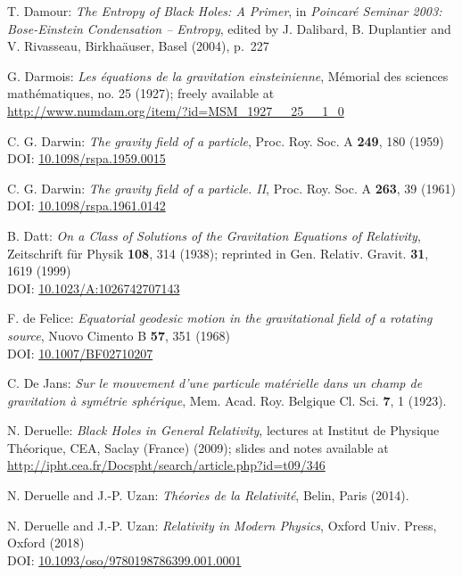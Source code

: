 \begin{thebibliography}{123}
T. Damour: {\em The Entropy of Black Holes: A Primer},
in {\em Poincaré Seminar 2003: Bose-Einstein Condensation -- Entropy},
edited by J. Dalibard, B. Duplantier and V. Rivasseau, Birkha\"auser, Basel (2004),
p.~227

G. Darmois:
{\em Les équations de la gravitation einsteinienne},
Mémorial des sciences mathématiques, no. 25 (1927); freely available at\\
\url{http://www.numdam.org/item/?id=MSM_1927__25__1_0}

C. G. Darwin: {\em The gravity field of a particle},
Proc. Roy. Soc. A {\bf 249}, 180 (1959)\\
DOI: \href{https://doi.org/10.1098/rspa.1959.0015}{10.1098/rspa.1959.0015}

C. G. Darwin: {\em The gravity field of a particle. II},
Proc. Roy. Soc. A {\bf 263}, 39 (1961)\\
DOI: \href{https://doi.org/10.1098/rspa.1961.0142}{10.1098/rspa.1961.0142}

B. Datt:
{\em On a Class of Solutions of the Gravitation Equations of Relativity},
Zeitschrift für Physik {\bf 108}, 314 (1938);
reprinted in Gen. Relativ. Gravit. {\bf 31}, 1619 (1999)\\
DOI: \href{https://doi.org/10.1023/A:1026742707143}{10.1023/A:1026742707143}

F. de Felice:
{\em Equatorial geodesic motion in the gravitational field of a rotating source},
Nuovo Cimento B {\bf 57}, 351 (1968)\\
DOI: \href{https://doi.org/10.1007/BF02710207}{10.1007/BF02710207}

C. De Jans:
\emph{Sur le mouvement d'une particule matérielle dans un champ de gravitation à symétrie sphérique},
Mem. Acad. Roy. Belgique Cl. Sci. {\bf 7}, 1 (1923).

N. Deruelle: {\em Black Holes in General Relativity}, lectures at
Institut de Physique Théorique, CEA, Saclay (France) (2009); slides and notes
available at \\
\url{http://ipht.cea.fr/Docspht/search/article.php?id=t09/346}

N. Deruelle and J.-P. Uzan: {\em Th\'eories de la Relativit\'e},
Belin, Paris (2014).

N. Deruelle and J.-P. Uzan: {\em Relativity in Modern Physics},
Oxford Univ. Press, Oxford (2018)\\
DOI: \href{https://doi.org/10.1093/oso/9780198786399.001.0001}{10.1093/oso/9780198786399.001.0001}


\end{thebibliography}
